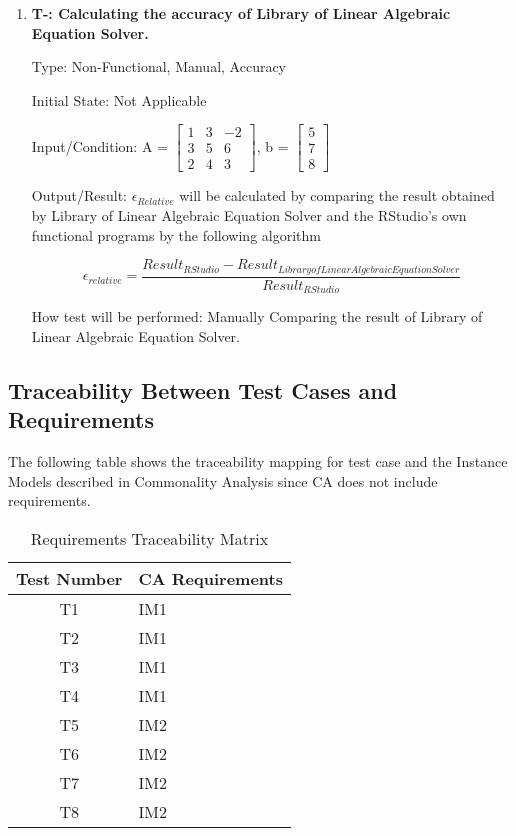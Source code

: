 \documentclass[12pt, titlepage]{article}
\newcounter{tnum}
\begin{document}
\begin{enumerate}

\item{\textbf{T-\thetnum \label{t-speed}: Calculating the
accuracy of Library of Linear Algebraic Equation Solver.}}


Type: Non-Functional, Manual, Accuracy
					
Initial State: Not Applicable
					
Input/Condition: A = $\begin{bmatrix} 
1 & 3 & -2 \\
3 & 5 & 6\\
2 & 4 & 3
\end{bmatrix}$, b = $\begin{bmatrix} 
5\\
7\\
8 
\end{bmatrix}$
					
Output/Result: $\epsilon_{Relative}$ will be calculated by comparing the result
obtained by Library of Linear Algebraic Equation Solver and the RStudio's own
functional programs by the following algorithm

\[\epsilon_{relative} = \frac{Result_{RStudio} - Result_{Library of Linear
Algebraic Equation Solver}}{Result_{RStudio}}\]
					
How test will be performed: Manually Comparing the result of Library of Linear
Algebraic Equation Solver.
					
\end{enumerate}



\subsection{Traceability Between Test Cases and Requirements}

The following table shows the traceability mapping for test case and the
Instance Models described in Commonality Analysis since CA does not include
requirements.

\begin{table} [H]
  \caption{Requirements Traceability Matrix}
  \label{Table:Table_Traceability}  
\begin{tabular}{|c|p{8cm}|}
  \hline	
  \textbf{Test Number} & \textbf{CA Requirements}\\
  \hline 
   T1& IM1\\ \hline
   T2& IM1\\ \hline
   T3& IM1\\ \hline
   T4& IM1\\ \hline
   T5& IM2\\ \hline
   T6& IM2\\ \hline
   T7& IM2\\ \hline
   T8& IM2\\ \hline
   
  

\end{tabular}\\
\end{table}
\end{document}
